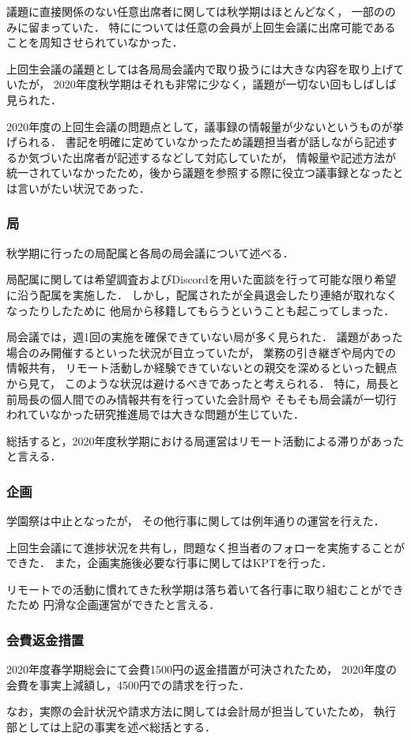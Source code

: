 議題に直接関係のない任意出席者に関しては秋学期はほとんどなく，
一部の\fourthGrade{}のみに留まっていた．
特に\firstGrade{}については任意の会員が上回生会議に出席可能であることを周知させられていなかった．

上回生会議の議題としては各局局会議内で取り扱うには大きな内容を取り上げていたが，
2020年度秋学期はそれも非常に少なく，議題が一切ない回もしばしば見られた．

2020年度の上回生会議の問題点として，議事録の情報量が少ないというものが挙げられる．
書記を明確に定めていなかったため議題担当者が話しながら記述するか気づいた出席者が記述するなどして対応していたが，
情報量や記述方法が統一されていなかったため，後から議題を参照する際に役立つ議事録となったとは言いがたい状況であった．

\subsubsection*{局}
秋学期に行った\firstGrade{}の局配属と各局の局会議について述べる．

局配属に関しては希望調査およびDiscordを用いた面談を行って可能な限り希望に沿う配属を実施した．
しかし，配属された\firstGrade{}が全員退会したり連絡が取れなくなったりしたために
他局から移籍してもらうということも起こってしまった．

局会議では，週1回の実施を確保できていない局が多く見られた．
議題があった場合のみ開催するといった状況が目立っていたが，
業務の引き継ぎや局内での情報共有，
リモート活動しか経験できていない\firstGrade{}との親交を深めるといった観点から見て，
このような状況は避けるべきであったと考えられる．
特に，局長と前局長の個人間でのみ情報共有を行っていた会計局や
そもそも局会議が一切行われていなかった研究推進局では大きな問題が生じていた．

総括すると，2020年度秋学期における局運営はリモート活動による滞りがあったと言える．

\subsubsection*{企画}
学園祭は中止となったが，
その他行事に関しては例年通りの運営を行えた．

上回生会議にて進捗状況を共有し，問題なく担当者のフォローを実施することができた．
また，企画実施後必要な行事に関してはKPTを行った．

リモートでの活動に慣れてきた秋学期は落ち着いて各行事に取り組むことができたため
円滑な企画運営ができたと言える．

\subsubsection*{会費返金措置}
2020年度春学期総会にて会費1500円の返金措置が可決されたため，
2020年度の会費を事実上減額し，4500円での請求を行った．

なお，実際の会計状況や請求方法に関しては会計局が担当していたため，
執行部としては上記の事実を述べ総括とする．
